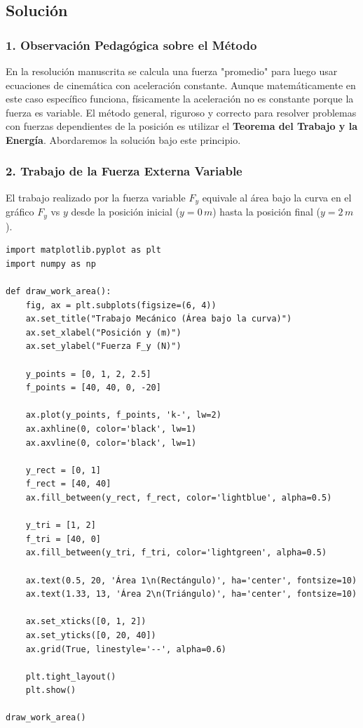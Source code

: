 \documentclass[12pt, a4paper]{article}
\begin{document}
\subsection*{Solución}

\subsubsection*{1. Observación Pedagógica sobre el Método}
En la resolución manuscrita se calcula una fuerza "promedio" para luego usar ecuaciones de cinemática con aceleración constante. Aunque matemáticamente en este caso específico funciona, físicamente la aceleración no es constante porque la fuerza es variable. El método general, riguroso y correcto para resolver problemas con fuerzas dependientes de la posición es utilizar el \textbf{Teorema del Trabajo y la Energía}. Abordaremos la solución bajo este principio.

\subsubsection*{2. Trabajo de la Fuerza Externa Variable}
El trabajo realizado por la fuerza variable $F_y$ equivale al área bajo la curva en el gráfico $F_y$ vs $y$ desde la posición inicial ($y = 0 \, \si{m}$) hasta la posición final ($y = 2 \, \si{m}$).

\begin{lstlisting}
import matplotlib.pyplot as plt
import numpy as np

def draw_work_area():
    fig, ax = plt.subplots(figsize=(6, 4))
    ax.set_title("Trabajo Mecánico (Área bajo la curva)")
    ax.set_xlabel("Posición y (m)")
    ax.set_ylabel("Fuerza F_y (N)")
    
    y_points = [0, 1, 2, 2.5]
    f_points = [40, 40, 0, -20]
    
    ax.plot(y_points, f_points, 'k-', lw=2)
    ax.axhline(0, color='black', lw=1)
    ax.axvline(0, color='black', lw=1)
    
    y_rect = [0, 1]
    f_rect = [40, 40]
    ax.fill_between(y_rect, f_rect, color='lightblue', alpha=0.5)
    
    y_tri = [1, 2]
    f_tri = [40, 0]
    ax.fill_between(y_tri, f_tri, color='lightgreen', alpha=0.5)
    
    ax.text(0.5, 20, 'Área 1\n(Rectángulo)', ha='center', fontsize=10)
    ax.text(1.33, 13, 'Área 2\n(Triángulo)', ha='center', fontsize=10)
    
    ax.set_xticks([0, 1, 2])
    ax.set_yticks([0, 20, 40])
    ax.grid(True, linestyle='--', alpha=0.6)
    
    plt.tight_layout()
    plt.show()

draw_work_area()
\end{lstlisting}
\end{document}
